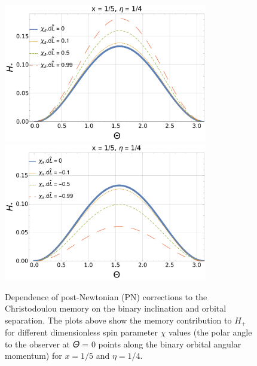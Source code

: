 \documentclass[twocolumn,showpacs,aps,prd,nobibnotes,floatfix]{revtex4-1}
\begin{document}
\begin{figure}
	\includegraphics[width=3.5in]{../plots/PNmemorycontributionHpAlginedSpinAngular.pdf}
	\includegraphics[width=3.5in]{../plots/PNmemorycontributionHpAntiAlginedSpinAngular.pdf}
	\caption{Dependence of post-Newtonian (PN) corrections to the Christodoulou memory on the binary inclination and orbital separation. The plots above show the memory contribution to $H_+$ for different dimensionless spin parameter $\chi$ values (the polar angle to the observer at 𝛩 = 0 points along the binary orbital angular momentum) for $x = 1/5$ and $\eta=1/4$.}
\end{figure}
\end{document}
